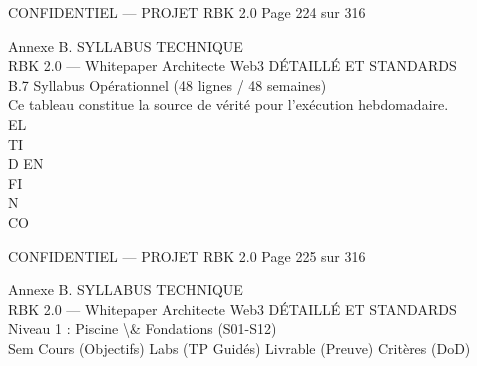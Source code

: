 \vspace{0.5em}
\vspace{0.5em}
\vspace{0.5em}
\vspace{0.5em}
\begin{confidential}CONFIDENTIEL — PROJET RBK 2.0                                    Page 224 sur 316\end{confidential}
Annexe B. SYLLABUS TECHNIQUE\\
RBK 2.0 — Whitepaper Architecte Web3                                                 DÉTAILLÉ ET STANDARDS\\
\vspace{0.5em}
\vspace{0.5em}
\vspace{0.5em}
B.7 Syllabus Opérationnel (48 lignes / 48 semaines)\\
Ce tableau constitue la source de vérité pour l’exécution hebdomadaire.\\
\vspace{0.5em}
\vspace{0.5em}
\vspace{0.5em}
\vspace{0.5em}
EL\\
TI\\
D    EN\\
FI\\
N\\
CO\\
\vspace{0.5em}
\vspace{0.5em}
\vspace{0.5em}
\vspace{0.5em}
\begin{confidential}CONFIDENTIEL — PROJET RBK 2.0                              Page 225 sur 316\end{confidential}
Annexe B. SYLLABUS TECHNIQUE\\
RBK 2.0 — Whitepaper Architecte Web3                                                                                         DÉTAILLÉ ET STANDARDS\\
\vspace{0.5em}
\vspace{0.5em}
Niveau 1 : Piscine \textbackslash{}& Fondations (S01-S12)\\
\vspace{0.5em}
Sem    Cours (Objectifs)                     Labs (TP Guidés)                Livrable (Preuve)         Critères (DoD)\\

